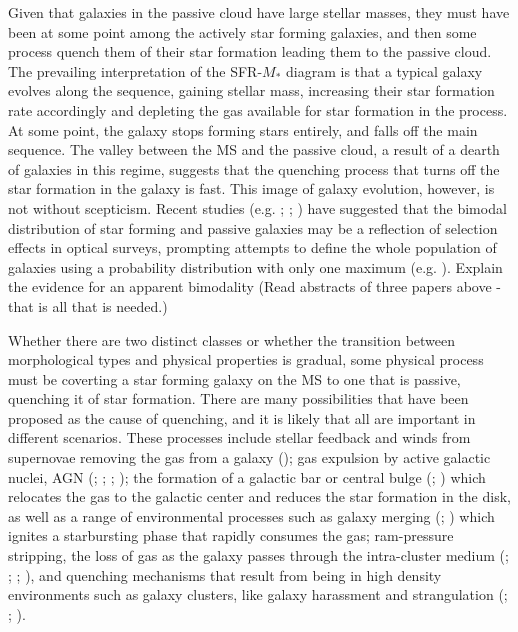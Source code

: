 Given that galaxies in the passive cloud have large stellar masses, they must have been at some point among the actively star forming galaxies, and then some process quench them of their star formation leading them to the passive cloud. The prevailing interpretation of the SFR-$M_*$ diagram is that a typical galaxy evolves along the sequence, gaining stellar mass, increasing their star formation rate accordingly and depleting the gas available for star formation in the process. At some point, the galaxy stops forming stars entirely, and falls off the main sequence. The valley between the MS and the passive cloud, a result of a dearth of galaxies in this regime, suggests that the quenching process that turns off the star formation in the galaxy is fast. This image of galaxy evolution, however, is not without scepticism. Recent studies (e.g. \citealt{Eales_2018}; \citealt{Bremer_2018}; \citealt{Phillipps_2019}) have suggested that the bimodal distribution of star forming and passive galaxies may be a reflection of selection effects in optical surveys, prompting attempts to define the whole population of galaxies using a probability distribution with only one maximum (e.g. \citealt{Corcho-Caballero_2020}). {\color{red}Explain the evidence for an apparent bimodality (Read abstracts of three papers above - that is all that is needed.)}

Whether there are two distinct classes or whether the transition between morphological types and physical properties is gradual, some physical process must be coverting a star forming galaxy on the MS to one that is passive, quenching it of star formation. There are many possibilities that have been proposed as the cause of quenching, and it is likely that all are important in different scenarios. These processes include stellar feedback and winds from supernovae removing the gas from a galaxy (\citealt{Hayward_2017}); gas expulsion by active galactic nuclei, AGN (\citealt{Springel_2005}; \citealt{Croton_2006}; \citealt{Cicone_2014}; \citealt{Harrison_2017}); the formation of a galactic bar or central bulge (\citealt{Bournaud_2007}; \citealt{Martig_2009}) which relocates the gas to the galactic center and reduces the star formation in the disk, as well as a range of environmental processes such as galaxy merging (\citealt{Lavery_1994}; \citealt{Weigel_2017}) which ignites a starbursting phase that rapidly consumes the gas; ram-pressure stripping, the loss of gas as the galaxy passes through the intra-cluster medium (\citealt{Gunn_1972}; \citealt{Boselli_2006}; \citealt{Domainko_2006}; \citealt{Boselli_2014}), and quenching mechanisms that result from being in high density environments such as galaxy clusters, like galaxy harassment and strangulation (\citealt{Moore_1996}; \citealt{Moore_1998}; \citealt{Bekki_2002}).

